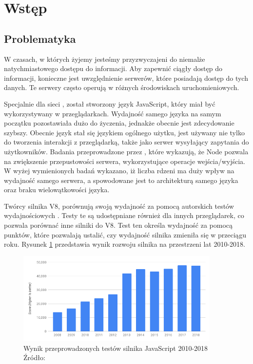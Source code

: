 \section{Wstęp}

\subsection{Problematyka}
W czasach, w których żyjemy jesteśmy przyzwyczajeni do niemalże natychmiastowego dostępu do informacji. Aby zapewnić ciągły dostęp do informacji, konieczne jest uwzględnienie serwerów, które posiadają dostęp do tych danych. Te serwery często operują w różnych środowiskach uruchomieniowych.

Specjalnie dla sieci , został stworzony język JavaScript, który miał być wykorzystywany w przeglądarkach. Wydajność samego języka na samym początku pozostawiała dużo do życzenia, jednakże obecnie jest zdecydowanie szybszy. Obecnie język stał się językiem ogólnego użytku, jest używany nie tylko do tworzenia interakcji z przeglądarką, także jako serwer wysyłający zapytania  do użytkowników. Badania przeprowadzone przez \cite{comparison_of_servers}, które wykazują, że Node pozwala na zwiększenie przepustowości serwera, wykorzystujące operacje wejścia/wyjścia. W wyżej wymienionych badań wykazano, iż liczba rdzeni ma duży wpływ na wydajność samego serwera, a spowodowane jest to architekturą samego języka oraz braku wielowątkowości języka. 

Twórcy silnika V8, porównują swoją wydajność za pomocą autorskich testów wydajnościowych \cite{ten_years_of_v8_chromium} \cite{ten_years_of_v8}. Testy te są udostępniane również dla innych przeglądarek, co pozwala porównać inne silniki do V8. Test ten określa wydajność za pomocą punktów, które pozwalają ustalić, czy wydajność silnika zmieniła się w przeciągu roku. Rysunek \ref{fig:performance_v8} przedstawia wynik rozwoju silnika na przestrzeni lat 2010-2018.

\begin{figure}[h]
  \centering
  \includegraphics[width=0.9\textwidth]{Figures/v8_bench_2010_2018.png}
  \caption{Wynik przeprowadzonych testów silnika JavaScript 2010-2018 Źródło: \cite{ten_years_of_v8_chromium}}
  \label{fig:performance_v8}
\end{figure}

